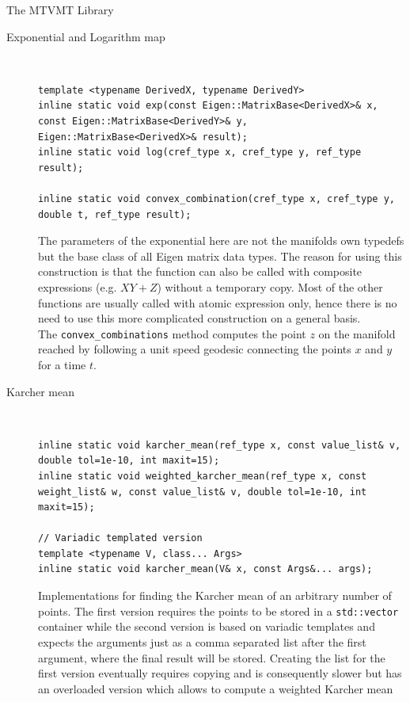 \begin{chapter}{The MTVMT Library}
\begin{description}
    \item[Exponential and Logarithm map] \hfill \\
	\cppinline
	\begin{lstlisting}
template <typename DerivedX, typename DerivedY>
inline static void exp(const Eigen::MatrixBase<DerivedX>& x, const Eigen::MatrixBase<DerivedY>& y, Eigen::MatrixBase<DerivedX>& result);
inline static void log(cref_type x, cref_type y, ref_type result);

inline static void convex_combination(cref_type x, cref_type y, double t, ref_type result);
	\end{lstlisting}

	The parameters of the exponential here are not the manifolds own typedefs but the base class of all Eigen matrix data types. The reason for using this construction is that the function
	can also be called with composite expressions (e.g. $XY+Z$) without a temporary copy. Most of the other functions are usually called with atomic expression only, hence there is no
	need to use this more complicated construction on a general basis.\\
	The \texttt{convex\_combinations} method computes the point $z$ on the manifold reached by following a unit speed geodesic connecting the points $x$ and $y$ for a time $t$.

    \item[Karcher mean] \hfill \\
	\cppinline
	\begin{lstlisting}
inline static void karcher_mean(ref_type x, const value_list& v, double tol=1e-10, int maxit=15);
inline static void weighted_karcher_mean(ref_type x, const weight_list& w, const value_list& v, double tol=1e-10, int maxit=15);

// Variadic templated version
template <typename V, class... Args>
inline static void karcher_mean(V& x, const Args&... args);
	\end{lstlisting}
	
	Implementations for finding the Karcher mean of an arbitrary number of points. The first version requires the points to be stored in a \texttt{std::vector} container while
	the second version is based on variadic templates and expects the arguments just as a comma separated list after the first argument, where the final result will be stored.
	Creating the list for the first version eventually requires copying and is consequently slower but has an overloaded version which allows to compute a weighted Karcher mean
    

\end{description}
\end{chapter}
